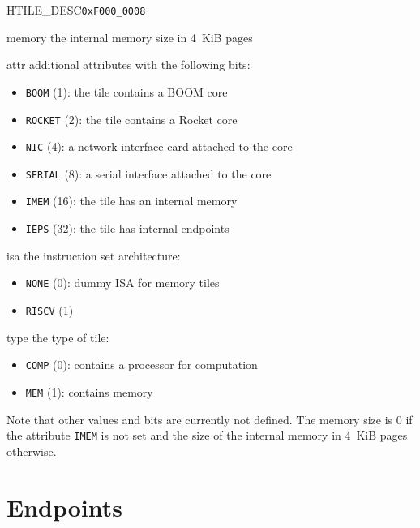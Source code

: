 \begin{register}{H}{TILE\_DESC}{\texttt{0xF000\_0008}}
  \regnewline%
  \begin{regdesc}\begin{reglist}
    \item[memory] the internal memory size in 4~KiB pages
    \item[attr] additional attributes with the following bits:
    \begin{itemize}
      \item \texttt{BOOM} (1): the tile contains a BOOM core
      \item \texttt{ROCKET} (2): the tile contains a Rocket core
      \item \texttt{NIC} (4): a network interface card attached to the core
      \item \texttt{SERIAL} (8): a serial interface attached to the core
      \item \texttt{IMEM} (16): the tile has an internal memory
      \item \texttt{IEPS} (32): the tile has internal endpoints
    \end{itemize}
    \item[isa] the instruction set architecture:
    \begin{itemize}
      \item \texttt{NONE} (0): dummy ISA for memory tiles
      \item \texttt{RISCV} (1)
    \end{itemize}
    \item[type] the type of tile:
    \begin{itemize}
      \item \texttt{COMP} (0): contains a processor for computation
      \item \texttt{MEM} (1): contains memory
    \end{itemize}
  \end{reglist}\end{regdesc}
\end{register}

\noindent Note that other values and bits are currently not defined. The memory size is 0 if the
attribute \texttt{IMEM} is not set and the size of the internal memory in 4~KiB pages otherwise.

\section{Endpoints}

